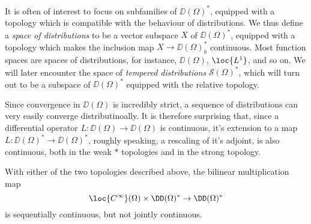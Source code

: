 It is often of interest to focus on subfamilies of $\DD(\Omega)^*$, equipped with a topology which is compatible with the behaviour of distributions. We thus define a \emph{space of distributions} to be a vector subspace $X$ of $\DD(\Omega)^*$, equipped with a topology which makes the inclusion map $X \to \DD(\Omega)^*_b$ continuous. Most function spaces are spaces of distributions, for instance, $\DD(\Omega)$, $\loc{L^1}$, and so on. We will later encounter the space of \emph{tempered distributions} $\mathcal{S}(\Omega)^*$, which will turn out to be a subspace of $\DD(\Omega)^*$ equipped with the relative topology.

Since convergence in $\DD(\Omega)$ is incredibly strict, a sequence of distributions can very easily converge distributinoally. It is therefore surprising that, since a differential operator $L: \DD(\Omega) \to \DD(\Omega)$ is continuous, it's extension to a map $L: \DD(\Omega)^* \to \DD(\Omega)^*$, roughly speaking, a rescaling of it's adjoint, is also continuous, both in the weak $*$ topologies and in the strong topology.

With either of the two topologies described above, the bilinear multiplication map
%
\[ \loc{C^\infty}(\Omega) \times \DD(\Omega)^* \to \DD(\Omega)^* \]
%
is sequentially continuous, but not jointly continuous.



